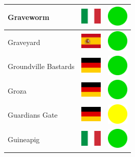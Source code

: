\documentclass[12pt, a4paper, twoside]{report}
\begin{document}
\begin{center}
\begin{longtable}{|p{5cm}|p{2cm}|p{2cm}|}
 Graveworm                                                  & \includegraphics[width=1cm]{../4x3/it} &   \includegraphics[width=1cm]{../likes/y} \\ \hline
 Graveyard                                                  & \includegraphics[width=1cm]{../4x3/es} &   \includegraphics[width=1cm]{../likes/y} \\ \hline
 Groundville Bastards                                       & \includegraphics[width=1cm]{../4x3/de} &   \includegraphics[width=1cm]{../likes/y} \\ \hline
 Groza                                                      & \includegraphics[width=1cm]{../4x3/de} &   \includegraphics[width=1cm]{../likes/y} \\ \hline
 Guardians Gate                                             & \includegraphics[width=1cm]{../4x3/de} &   \includegraphics[width=1cm]{../likes/m} \\ \hline
 Guineapig                                                  & \includegraphics[width=1cm]{../4x3/it} &   \includegraphics[width=1cm]{../likes/y} \\ \hline

\end{longtable}
\end{center}
\end{document}
